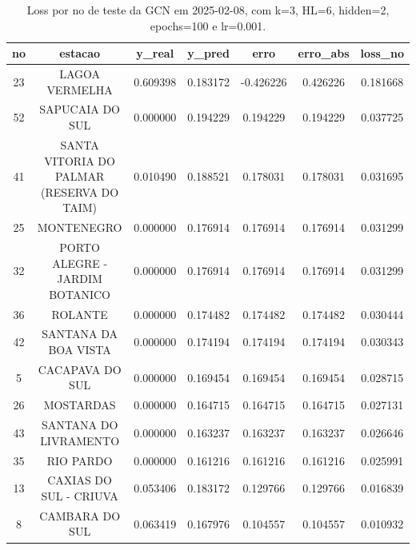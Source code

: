 \begin{table}[h]
\centering
\caption{Loss por no de teste da GCN em 2025-02-08, com k=3, HL=6, hidden=2, epochs=100 e lr=0.001.}
\label{tab:gcn_loss_k3_hl6_h2_e100_d20250208}
\begin{tabular}{ccccccc}
\toprule
no & estacao & y\_real & y\_pred & erro & erro\_abs & loss\_no \\
\midrule
23 & LAGOA VERMELHA & 0.609398 & 0.183172 & -0.426226 & 0.426226 & 0.181668 \\
52 & SAPUCAIA DO SUL & 0.000000 & 0.194229 & 0.194229 & 0.194229 & 0.037725 \\
41 & SANTA VITORIA DO PALMAR (RESERVA DO TAIM) & 0.010490 & 0.188521 & 0.178031 & 0.178031 & 0.031695 \\
25 & MONTENEGRO & 0.000000 & 0.176914 & 0.176914 & 0.176914 & 0.031299 \\
32 & PORTO ALEGRE - JARDIM BOTANICO & 0.000000 & 0.176914 & 0.176914 & 0.176914 & 0.031299 \\
36 & ROLANTE & 0.000000 & 0.174482 & 0.174482 & 0.174482 & 0.030444 \\
42 & SANTANA DA BOA VISTA & 0.000000 & 0.174194 & 0.174194 & 0.174194 & 0.030343 \\
5 & CACAPAVA DO SUL & 0.000000 & 0.169454 & 0.169454 & 0.169454 & 0.028715 \\
26 & MOSTARDAS & 0.000000 & 0.164715 & 0.164715 & 0.164715 & 0.027131 \\
43 & SANTANA DO LIVRAMENTO & 0.000000 & 0.163237 & 0.163237 & 0.163237 & 0.026646 \\
35 & RIO PARDO & 0.000000 & 0.161216 & 0.161216 & 0.161216 & 0.025991 \\
13 & CAXIAS DO SUL - CRIUVA & 0.053406 & 0.183172 & 0.129766 & 0.129766 & 0.016839 \\
8 & CAMBARA DO SUL & 0.063419 & 0.167976 & 0.104557 & 0.104557 & 0.010932 \\
\bottomrule
\end{tabular}
\end{table}
